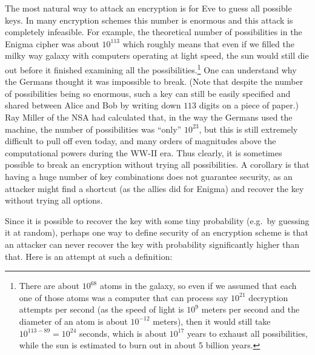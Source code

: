 The most natural way to attack an encryption is for Eve to guess all
possible keys. In many encryption schemes this number is enormous and
this attack is completely infeasible. For example, the theoretical
number of possibilities in the Enigma cipher was about \(10^{113}\)
which roughly means that even if we filled the milky way galaxy with
computers operating at light speed, the sun would still die out before
it finished examining all the possibilities.\footnote{There are about
  \(10^{68}\) atoms in the galaxy, so even if we assumed that each one
  of those atoms was a computer that can process say \(10^{21}\)
  decryption attempts per second (as the speed of light is \(10^9\)
  meters per second and the diameter of an atom is about \(10^{-12}\)
  meters), then it would still take \(10^{113-89} = 10^{24}\) seconds,
  which is about \(10^{17}\) years to exhaust all possibilities, while
  the sun is estimated to burn out in about 5 billion years.} One can
understand why the Germans thought it was impossible to break. (Note
that despite the number of possibilities being so enormous, such a key
can still be easily specified and shared between Alice and Bob by
writing down \(113\) digits on a piece of paper.) Ray Miller of the NSA
had calculated that, in the way the Germans used the machine, the number
of possibilities was ``only'' \(10^{23}\), but this is still extremely
difficult to pull off even today, and many orders of magnitudes above
the computational powers during the WW-II era. Thus clearly, it is
sometimes possible to break an encryption without trying all
possibilities. A corollary is that having a huge number of key
combinations does not guarantee security, as an attacker might find a
shortcut (as the allies did for Enigma) and recover the key without
trying all options.

Since it is possible to recover the key with some tiny probability
(e.g.~by guessing it at random), perhaps one way to define security of
an encryption scheme is that an attacker can never recover the key with
probability significantly higher than that. Here is an attempt at such a
definition:

\hypertarget{securefirstattemptdef}{}

